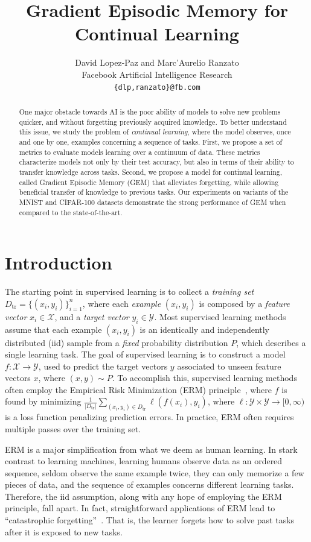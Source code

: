 \documentclass{article}
\title{Gradient Episodic Memory for Continual Learning}
\author{
  David Lopez-Paz and Marc'Aurelio Ranzato\\
  Facebook Artificial Intelligence Research\\
  \texttt{\{dlp,ranzato\}@fb.com} \\
}
\newcommand{\X}{\mathcal{X}}
\newcommand{\Y}{\mathcal{Y}}
\begin{document}
\maketitle

\begin{abstract}
  One major obstacle towards AI is the poor ability of models to solve new
  problems quicker, and without forgetting previously acquired knowledge.  To
  better understand this issue, we study the problem of \emph{continual
  learning}, where the model observes, once and one by one, examples concerning
  a sequence of tasks.  First, we propose a set of metrics to evaluate models
  learning over a continuum of data. These metrics characterize models not only
  by their test accuracy, but also in terms of their ability to transfer
  knowledge across tasks.  Second, we propose a model for continual learning,
  called Gradient Episodic Memory (GEM) that alleviates forgetting, while
  allowing beneficial transfer of knowledge to previous tasks.  Our experiments
  on variants of the MNIST and CIFAR-100 datasets demonstrate the strong
  performance of GEM when compared to the state-of-the-art.
\end{abstract}

\section{Introduction}
The starting point in supervised learning is to collect a \emph{training set}
$D_{\text{tr}} = \{(x_i, y_i)\}_{i=1}^n$, where each \emph{example} $(x_i,
y_i)$ is composed by a \emph{feature vector} $x_i \in \X$, and a \emph{target
vector} $y_i \in \Y$. Most supervised learning methods assume that each example
$(x_i, y_i)$ is an identically and independently distributed (iid) sample from
a \emph{fixed} probability distribution $P$, which describes a single learning
task.  The goal of supervised learning is to construct a model $f : \X \to \Y$,
used to predict the target vectors $y$ associated to unseen feature vectors
$x$, where $(x, y) \sim P$. To accomplish this, supervised learning methods
often employ the {Empirical Risk Minimization} (ERM)
principle~\citep{Vapnik98}, where $f$ is found by minimizing
$\frac{1}{|D_{\text{tr}}|} \sum_{(x_i, y_i) \in D_\text{tr}} \ell(f(x_i),
y_i)$, where  $\ell : \Y \times \Y \to [0, \infty)$ is a loss function
penalizing prediction errors. In practice, ERM often requires multiple passes
over the training set. 

ERM is a major simplification from what we deem as human learning. In stark
contrast to learning machines, learning humans observe data as an ordered
sequence, seldom observe the same example twice, they can only memorize a few
pieces of data, and the sequence of examples concerns different learning tasks.
Therefore, the iid assumption, along with any hope of employing the ERM
principle, fall apart. In fact, straightforward applications of ERM lead to
``catastrophic forgetting''~\citep{catastrophic}.  That is, the learner forgets
how to solve past tasks after it is exposed to new tasks.
\end{document}
